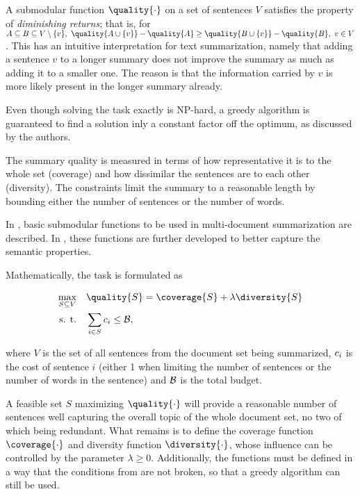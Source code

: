 A submodular function $\quality{\cdot}$ on a set of sentences $V$ satisfies the property of \textit{diminishing returns}; that is, for $A \subseteq B \subseteq V \setminus \{ v \},\ \quality{A \cup \{ v \}} - \quality{A} \geq \quality{B \cup \{ v \}} - \quality{B},\ v \in V$. This has an intuitive interpretation for text summarization, namely that adding a sentence $v$ to a longer summary does not improve the summary as much as adding it to a smaller one. The reason is that the information carried by $v$ is more likely present in the longer summary already.

Even though solving the task exactly is NP-hard, a greedy algorithm is guaranteed to find a solution inly a constant factor off the optimum, as discussed by the authors.

The summary quality is measured in terms of how representative it is to the whole set (coverage) and how dissimilar the sentences are to each other (diversity). The constraints limit the summary to a reasonable length by bounding either the number of sentences or the number of words.

In \cite{multi-summarization-1}, basic submodular functions to be used in multi-document summarization are described. In \cite{multi-summarization-2}, these functions are further developed to better capture the semantic properties.

Mathematically, the task is formulated as

\begin{equation}
\begin{alignedat}{-1}
\max_{S \subseteq V} & \quad \quality{S} = \coverage{S} + \lambda \diversity{S} \\
\text{s. t.} & \quad \sum_{i \in S}{\sentcost_{i}} \leq \budget,
\end{alignedat}
\end{equation}

where $V$ is the set of all sentences from the document set being summarized, $c_{i}$ is the cost of sentence $i$ (either 1 when limiting the number of sentences or the number of words in the sentence) and $\mathcal{B}$ is the total budget.

A feasible set $S$ maximizing $\quality{\cdot}$ will provide a reasonable number of sentences well capturing the overall topic of the whole document set, no two of which being redundant. What remains is to define the coverage function $\coverage{\cdot}$ and diversity function $\diversity{\cdot}$, whose influence can be controlled by the parameter $\lambda \geq 0$. Additionally, the functions must be defined in a way that the conditions from \cite{multi-summarization-1} are not broken, so that a greedy algorithm can still be used.


